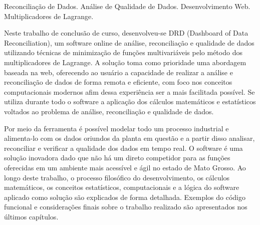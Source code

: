 \documentclass[tcc/eca]{faeng}
\begin{document}
\begin{resumo}{Reconciliação de Dados. Análise de Qualidade de Dados. Desenvolvimento Web. Multiplicadores de Lagrange.}

Neste trabalho de conclusão de curso, desenvolveu-se DRD (Dashboard of Data Reconciliation), um software online de análise, reconciliação e qualidade de dados utilizando técnicas de minimização de funções multivariáveis pelo método dos multiplicadores de Lagrange. A solução toma como prioridade uma abordagem baseada na web, oferecendo ao usuário a capacidade de realizar a análise e reconciliação de dados de forma remota e eficiente, com foco nos conceitos computacionais modernos afim dessa experiência ser a mais facilitada possível. Se utiliza durante todo o software a aplicação dos cálculos matemáticos e estatísticos voltados ao problema de análise, reconciliação e qualidade de dados. 

Por meio da ferramenta é possível modelar todo um processo industrial e alimenta-lo com os dados oriundos da planta em questão e a partir disso analisar, reconciliar e verificar a qualidade dos dados em tempo real. O software é uma solução inovadora dado que não há um direto competidor para as funções oferecidas em um ambiente mais acessível e ágil no estado de Mato Grosso. Ao longo deste trabalho, o processo filosófico do desenvolvimento, os cálculos matemáticos, os conceitos estatísticos, computacionais e a lógica do software aplicado como solução são explicados de forma detalhada. Exemplos do código funcional e considerações finais sobre o trabalho realizado são apresentados nos últimos capítulos.

\end{resumo}
\end{document}
